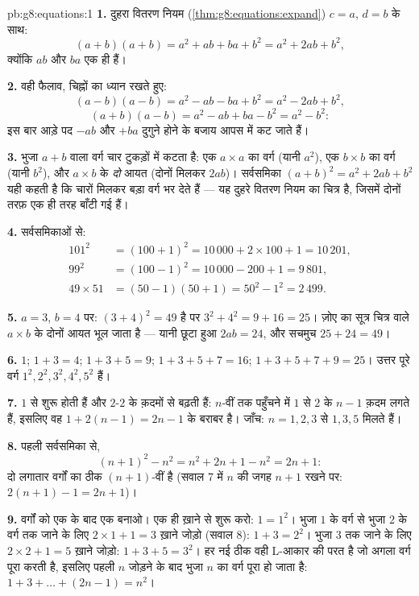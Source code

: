 \begin{solution}{pb:g8:equations:1}
\textbf{1.} दुहरा वितरण नियम
(\cref{thm:g8:equations:expand}) $c = a$, $d = b$ के साथ:
\[
(a + b)(a + b) = a^2 + ab + ba + b^2 = a^2 + 2ab + b^2 ,
\]
क्योंकि $ab$ और $ba$ एक ही  हैं।

\textbf{2.} वही फैलाव, चिह्नों का ध्यान रखते हुए:
\[
(a - b)(a - b) = a^2 - ab - ba + b^2 = a^2 - 2ab + b^2 ,
\]
\[
(a + b)(a - b) = a^2 - ab + ba - b^2 = a^2 - b^2 :
\]
इस बार आड़े पद $-ab$ और $+ba$ दुगुने होने के बजाय आपस में कट जाते
हैं।

\textbf{3.} भुजा $a + b$ वाला वर्ग चार टुकड़ों में कटता है: एक
$a \times a$ का वर्ग (यानी $a^2$), एक $b \times b$ का वर्ग (यानी
$b^2$), और $a \times b$ के \emph{दो} आयत (दोनों मिलकर $2ab$)।
सर्वसमिका $(a+b)^2 = a^2 + 2ab + b^2$ यही कहती है कि चारों
 मिलकर बड़ा वर्ग भर देते हैं --- यह दुहरे वितरण नियम का
चित्र है, जिसमें दोनों तरफ़ एक ही तरह बाँटी गई हैं।

\textbf{4.} सर्वसमिकाओं से:
\begin{align*}
101^2 &= (100 + 1)^2 = 10\,000 + 2 \times 100 + 1 = 10\,201, \\
99^2 &= (100 - 1)^2 = 10\,000 - 200 + 1 = 9\,801, \\
49 \times 51 &= (50 - 1)(50 + 1) = 50^2 - 1^2 = 2\,499 .
\end{align*}

\textbf{5.} $a = 3$, $b = 4$ पर: $(3 + 4)^2 = 49$ है पर
$3^2 + 4^2 = 9 + 16 = 25$। ज़ोए का सूत्र चित्र वाले $a \times b$
के दोनों आयत भूल जाता है --- यानी छूटा हुआ $2ab = 24$, और सचमुच
$25 + 24 = 49$।

\textbf{6.} $1$; $1 + 3 = 4$; $1 + 3 + 5 = 9$;
$1 + 3 + 5 + 7 = 16$; $1 + 3 + 5 + 7 + 9 = 25$। उत्तर पूरे वर्ग
$1^2, 2^2, 3^2, 4^2, 5^2$ हैं।

\textbf{7.}  $1$ से शुरू होती हैं और $2$-$2$ के क़दमों
से बढ़ती हैं: $n$-वीं तक पहुँचने में $1$ से $2$ के $n - 1$ क़दम लगते
हैं, इसलिए वह $1 + 2(n - 1) = 2n - 1$ के बराबर है। जाँच:
$n = 1, 2, 3$ से $1, 3, 5$ मिलते हैं।

\textbf{8.} पहली सर्वसमिका से,
\[
(n + 1)^2 - n^2 = n^2 + 2n + 1 - n^2 = 2n + 1 :
\]
दो लगातार वर्गों का  ठीक $(n+1)$-वीं  है (सवाल 7 में
$n$ की जगह $n + 1$ रखने पर: $2(n+1) - 1 = 2n + 1$)।

\textbf{9.} वर्गों को एक के बाद एक बनाओ। एक ही ख़ाने से शुरू करो:
$1 = 1^2$। भुजा $1$ के वर्ग से भुजा $2$ के वर्ग तक जाने के लिए
$2 \times 1 + 1 = 3$ ख़ाने जोड़ो (सवाल 8): $1 + 3 = 2^2$। भुजा $3$
तक जाने के लिए $2 \times 2 + 1 = 5$ ख़ाने जोड़ो:
$1 + 3 + 5 = 3^2$। हर नई  ठीक वही L-आकार की परत है जो
अगला वर्ग पूरा करती है, इसलिए पहली $n$  जोड़ने के बाद
भुजा $n$ का वर्ग पूरा हो जाता है:
$1 + 3 + \dots + (2n - 1) = n^2$।


\end{solution}
